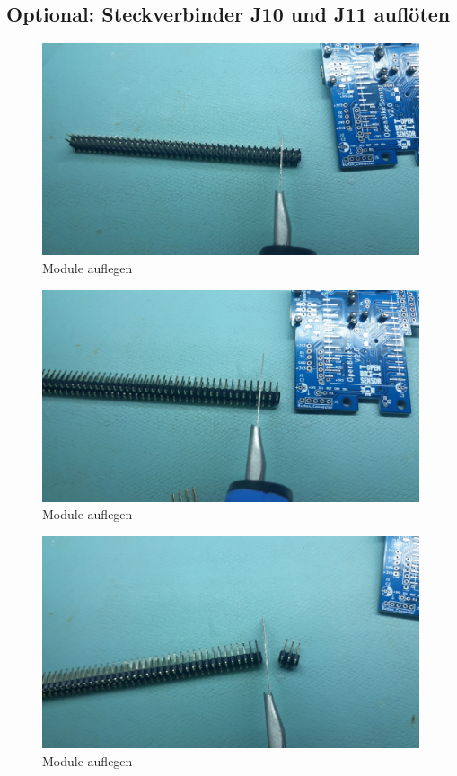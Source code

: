 \documentclass[12pt, a4paper]{article}		%
\begin{document}
\subsection{\bf{Optional:} Steckverbinder J10 und J11 auflöten}

\begin{figure}[H]
	\centering
		\includegraphics[width=0.99\textwidth]{Grafiken/20200726_123816.jpg}
	\caption{Module auflegen}
	\label{fig:20200726_123816}
\end{figure}

\begin{figure}[H]
	\centering
		\includegraphics[width=0.99\textwidth]{Grafiken/20200726_123840.jpg}
	\caption{Module auflegen}
	\label{fig:20200726_123840}
\end{figure}

\begin{figure}[H]
	\centering
		\includegraphics[width=0.99\textwidth]{Grafiken/20200726_123857.jpg}
	\caption{Module auflegen}
	\label{fig:20200726_123857}
\end{figure}
\end{document}
